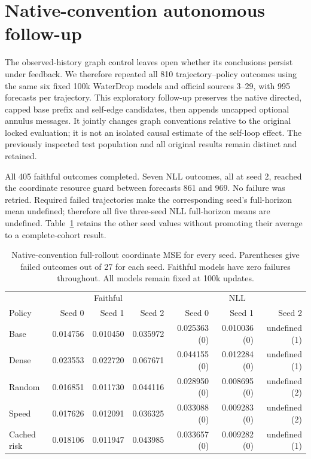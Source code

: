 \section{Native-convention autonomous follow-up}
\label{sec:native-rollout-followup}
The observed-history graph control leaves open whether its conclusions persist under feedback. We therefore repeated all 810 trajectory--policy outcomes using the same six fixed 100k WaterDrop models and official sources 3--29, with 995 forecasts per trajectory. This exploratory follow-up preserves the native directed, capped base prefix and self-edge candidates, then appends uncapped optional annulus messages. It jointly changes graph conventions relative to the original locked evaluation; it is not an isolated causal estimate of the self-loop effect. The previously inspected test population and all original results remain distinct and retained.

All 405 faithful outcomes completed. Seven NLL outcomes, all at seed 2, reached the coordinate resource guard between forecasts 861 and 969. No failure was retried. Required failed trajectories make the corresponding seed's full-horizon mean undefined; therefore all five three-seed NLL full-horizon means are undefined. Table~\ref{tab:native-rollout-seeds} retains the other seed values without promoting their average to a complete-cohort result.

\begin{table}[t]
\caption{Native-convention full-rollout coordinate MSE for every seed. Parentheses give failed outcomes out of 27 for each seed. Faithful models have zero failures throughout. All models remain fixed at 100k updates.}
\label{tab:native-rollout-seeds}
\centering\small
\begin{tabular}{lrrr|rrr}
\toprule
&\multicolumn{3}{c}{Faithful}&\multicolumn{3}{c}{NLL}\\
Policy&Seed 0&Seed 1&Seed 2&Seed 0&Seed 1&Seed 2\\
\midrule
Base&0.014756&0.010450&0.035972&0.025363 (0)&0.010036 (0)&undefined (1)\\
Dense&0.023553&0.022720&0.067671&0.044155 (0)&0.012284 (0)&undefined (1)\\
Random&0.016851&0.011730&0.044116&0.028950 (0)&0.008695 (0)&undefined (2)\\
Speed&0.017626&0.012091&0.036325&0.033088 (0)&0.009283 (0)&undefined (2)\\
Cached risk&0.018106&0.011947&0.043985&0.033657 (0)&0.009282 (0)&undefined (1)\\
\bottomrule
\end{tabular}
\end{table}

